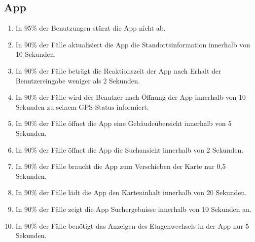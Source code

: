 \subsection{App}

\begin{enumerate}
    \item In 95\% der Benutzungen stürzt die App nicht ab.
    \item In 90\% der Fälle aktualisiert die App die Standortsinformation innerhalb von 10 Sekunden.
    \item In 90\% der Fälle beträgt die Reaktionszeit der App nach Erhalt der Benutzereingabe weniger als 2 Sekunden.
    \item In 90\% der Fälle wird der Benutzer nach Öffnung der App innerhalb von 10 Sekunden zu seinem GPS-Status informiert.
    \item In 90\% der Fälle öffnet die App eine Gebäudeübersicht innerhalb von 5 Sekunden.
    \item In 90\% der Fälle öffnet die App die Suchansicht innerhalb von 2 Sekunden.
    \item In 90\% der Fälle braucht die App zum Verschieben der Karte nur 0,5 Sekunden.
    \item In 90\% der Fälle lädt die App den Karteninhalt innerhalb von 20 Sekunden.
    \item In 90\% der Fälle zeigt die App Suchergebnisse innerhalb von 10 Sekunden an.
    \item In 90\% der Fälle benötigt das Anzeigen des Etagenwechsels in der App nur 5 Sekunden.
\end{enumerate}